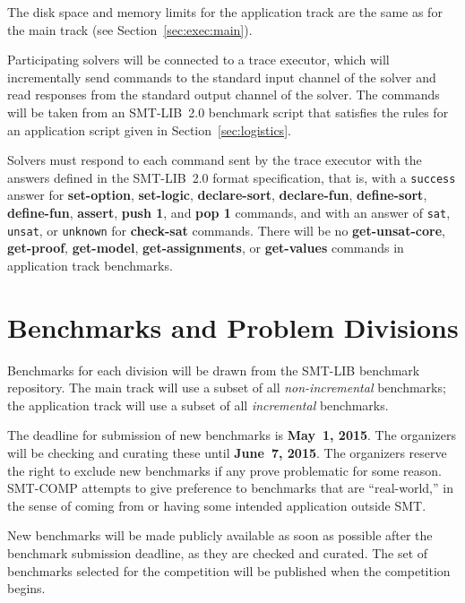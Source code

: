 \documentclass[12pt]{article}
\newcommand{\akey}[1]{\textbf{#1}}
\begin{document}
The disk space and memory limits for the application track are the
same as for the main track (see Section~\ref{sec:exec:main}).

%
Participating solvers will be connected to a trace executor, which
will incrementally send commands to the standard input channel of the
solver and read responses from the standard output channel of the
solver.  The commands will be taken from an SMT-LIB~2.0 benchmark
script that satisfies the rules for an application script given in
Section~\ref{sec:logistics}.

Solvers must respond to each command sent by the trace executor with
the answers defined in the SMT-LIB~2.0 format specification, that is,
with a \texttt{success} answer for \akey{set-option},
\akey{set-logic}, \akey{declare-sort}, \akey{declare-fun},
\akey{define-sort}, \akey{define-fun}, \akey{assert}, \akey{push 1},
and \akey{pop 1} commands, and with an answer of \texttt{sat},
\texttt{unsat}, or \texttt{unknown} for \akey{check-sat} commands.
There will be no \akey{get-unsat-core}, \akey{get-proof},
\akey{get-model}, \akey{get-assignments}, or \akey{get-values}
commands in application track benchmarks.


\section{Benchmarks and Problem Divisions}

%
Benchmarks for each division will be drawn from the SMT-LIB benchmark
repository.  The main track will use a subset of all
\emph{non-incremental} benchmarks; the application track will use a
subset of all \emph{incremental} benchmarks.

%
The deadline for submission of new benchmarks is {\bf May~1, 2015}.
The organizers will be checking and curating these until {\bf June~7,
  2015}.  The organizers reserve the right to exclude new benchmarks
if any prove problematic for some reason.  SMT-COMP attempts to give
preference to benchmarks that are ``real-world,'' in the sense of
coming from or having some intended application outside SMT.

New benchmarks will be made publicly available as soon as possible
after the benchmark submission deadline, as they are checked and
curated.  The set of benchmarks selected for the competition will be
published when the competition begins.
\end{document}
